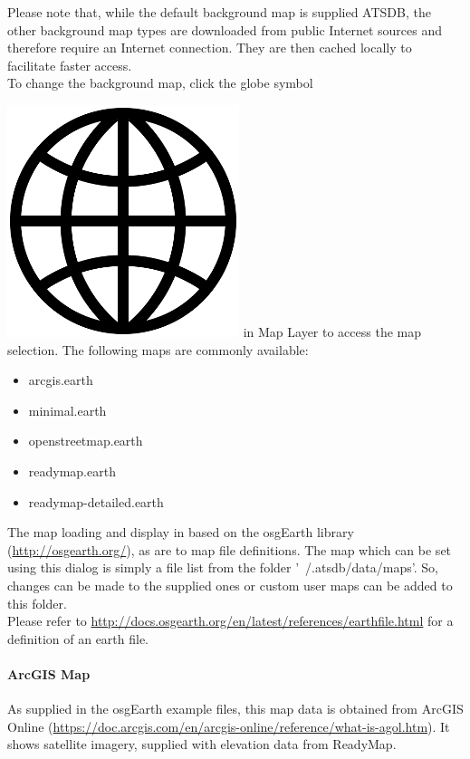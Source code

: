 Please note that, while the default background map is supplied ATSDB, the other background map types are downloaded from public Internet sources and therefore require an Internet connection. They are then cached locally to facilitate faster access. \\

To change the background map, click the globe symbol {\includegraphics[scale=0.05]{../../data/icons/globe.png} in Map Layer to access the map selection. The following maps are commonly available:

\begin{itemize}
 \item arcgis.earth
 \item minimal.earth
 \item openstreetmap.earth
 \item readymap.earth
 \item readymap-detailed.earth
\end{itemize}

The map loading and display in based on the osgEarth library (\url{http://osgearth.org/}), as are to map file definitions. The map which can be set using this dialog is simply a file list from the folder '~/.atsdb/data/maps'. So, changes can be made to the supplied ones or custom user maps can be added to this folder. \\
Please refer to \url{http://docs.osgearth.org/en/latest/references/earthfile.html} for a definition of an earth file.

\newpage
\paragraph{ArcGIS Map}

As supplied in the osgEarth example files, this map data is obtained from ArcGIS Online (\url{https://doc.arcgis.com/en/arcgis-online/reference/what-is-agol.htm}). It shows satellite imagery, supplied with elevation data from ReadyMap. 

}

